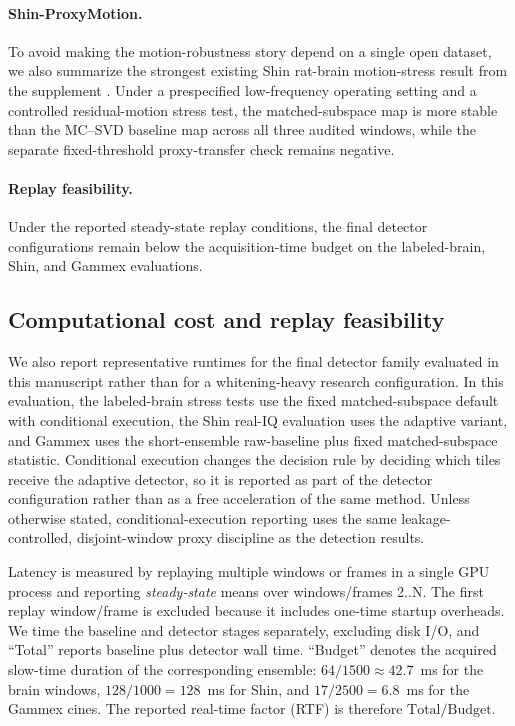 \documentclass[11pt]{article}
\newif\ifPAPERONLY
\begin{document}
\paragraph{Shin-ProxyMotion.}
To avoid making the motion-robustness story depend on a single open dataset, we also summarize the strongest existing Shin rat-brain motion-stress result from the supplement \cite{ShinLOCAULM2024,ShinZenodo10711806}. Under a prespecified low-frequency operating setting and a controlled residual-motion stress test, the matched-subspace map is more stable than the MC--SVD baseline map across all three audited windows, while the separate fixed-threshold proxy-transfer check remains negative.

\ifPAPERONLY
\paragraph{Replay feasibility.}
Under the reported steady-state replay conditions, the final detector configurations remain below the acquisition-time budget on the labeled-brain, Shin, and Gammex evaluations.
\else
\subsection{Computational cost and replay feasibility}
\label{sec:latency}
We also report representative runtimes for the final detector family evaluated in this manuscript rather than for a whitening-heavy research configuration. In this evaluation, the labeled-brain stress tests use the fixed matched-subspace default with conditional execution, the Shin real-IQ evaluation uses the adaptive variant, and Gammex uses the short-ensemble raw-baseline plus fixed matched-subspace statistic. Conditional execution changes the decision rule by deciding which tiles receive the adaptive detector, so it is reported as part of the detector configuration rather than as a free acceleration of the same method. Unless otherwise stated, conditional-execution reporting uses the same leakage-controlled, disjoint-window proxy discipline as the detection results.

Latency is measured by replaying multiple windows or frames in a single GPU process and reporting \emph{steady-state} means over windows/frames 2..N. The first replay window/frame is excluded because it includes one-time startup overheads. We time the baseline and detector stages separately, excluding disk I/O, and ``Total'' reports baseline plus detector wall time. ``Budget'' denotes the acquired slow-time duration of the corresponding ensemble: $64/1500\approx 42.7$~ms for the brain windows, $128/1000=128$~ms for Shin, and $17/2500=6.8$~ms for the Gammex cines. The reported real-time factor (RTF) is therefore $\text{Total}/\text{Budget}$.
\end{document}

